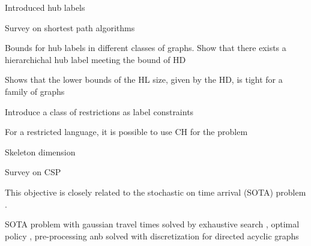 Introduced hub labels\cite{cohen_definition_hl}

Survey on shortest path algorithms \cite{goldberg_survey}

Bounds for hub labels in different classes of graphs. 
Show that there exists a hierarchichal hub label meeting the bound of HD \cite{babenko_hl_complexity}

Shows that the lower bounds of the HL size, given by the HD, is tight for a family of graphs \cite{white_complexity_hd}

Introduce a class of restrictions as label constraints \cite{language_csp}

For a restricted language, it is possible to use CH for the problem \cite{rice_csp}

Skeleton dimension \cite{skeleton}

Survey on CSP \cite{csp_survey}

This objective is closely related to the stochastic on time arrival (SOTA) problem \cite{fan2005arriving}.

SOTA problem with gaussian travel times solved by exhaustive search \cite{nikolova_gaussian}, optimal policy \cite{samaranayake2012speedup}, pre-processing \cite{sabran2014precomputation} anb solved with discretization for directed acyclic graphs \cite{nikolova_discretization}
